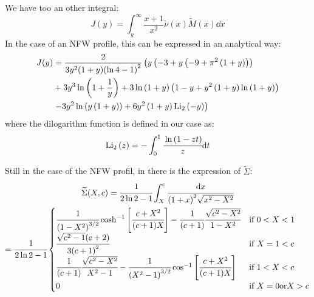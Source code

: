 %
We have too an other integral:
%
\begin{equation}
    J(y)=\int_y^{\infty}\frac{x+1}{x^2}\widetilde{\nu}{(x)}\widetilde{M}{(x)}\dd{x}
\end{equation}
%
In the case of an NFW profile, this can be expressed in an analytical way:
%
\begin{align*}
    J(y)&=
        \frac{2}{3{y^2}(1+y){\left(\ln{4}-1\right)}^2}
        \left(y\left(-3+y\left(-9+\pi^2\left(1+y\right)\right)\right)\right.\\
    &+3{y^3}\ln\left(1+\frac{1}{y}\right)+3\ln\left(1+y\right)
            \left(1-y+y^2\left(1+y\right)\ln\left(1+y\right)\right)\\
    &\left.-3{y^2}\ln\left({y}\left(1+y\right)\right)+6{y^2}
        \left(1+y\right){\mathrm{Li}_2\left(-y\right)}\right)\\
\end{align*}
%
where the dilogarithm function is defined in our case as:
%
\begin{equation}
    \mathrm{Li}_2\left(z\right)=-\int_0^1\cfrac{\ln{(1-zt)}}{z}{\rm{d}}{t}
\end{equation}

Still in the case of the NFW profil, in \citet{MBM+10} there is the expression
of $\widetilde{\Sigma}$:
%
\begin{multline}
    \widetilde{\Sigma}(X,c)=\cfrac{1}{2\ln2-1}\int_X^c\cfrac{{\rm{d}}{x}}{{(1+x)}^2\sqrt{x^2-X^2}}\\
    =\cfrac{1}{2\ln2-1}\begin{cases}
        \cfrac{1}{{(1-X^2)}^{3/2}}
        \cosh^{-1}\left[\cfrac{c+X^2}{(c+1)X}\right]-
        \cfrac{1}{(c+1)}\cfrac{\sqrt{c^2-X^2}}{1-X^2} &\text{if } 0<X<1 \\
    \cfrac{\sqrt{c^2-1}(c+2)}{3{(c+1)}^2} &\text{if } X=1<c\\
    \cfrac{1}{(c+1)}\cfrac{\sqrt{c^2-X^2}}{X^2-1}-
    \cfrac{1}{{(X^2-1)}^{3/2}}
    \cos^{-1}\left[\cfrac{c+X^2}{(c+1)X}\right] &\text{if } 1<X<c\\
    0 &\text{if } X=0\text{or}X>c
    \end{cases}
\end{multline}

